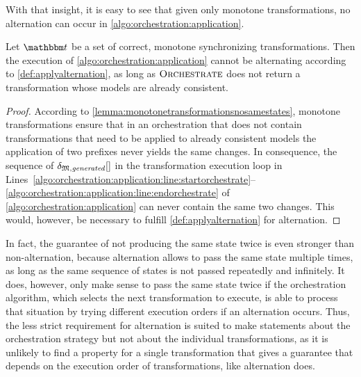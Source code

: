 With that insight, it is easy to see that given only monotone transformations, no alternation can occur in \autoref{algo:orchestration:application}.
\begin{theorem}
    Let $\transformationset{T}$ be a set of correct, monotone synchronizing transformations.
    Then the execution of \autoref{algo:orchestration:application} cannot be alternating according to \autoref{def:applyalternation}, as long as $\textsc{Orchestrate}$ does not return a transformation whose models are already consistent.
\end{theorem}
\begin{proof}
    According to \autoref{lemma:monotonetransformationsnosamestates}, monotone transformations ensure that in an orchestration that does not contain transformations that need to be applied to already consistent models the application of two prefixes never yields the same changes.
    In consequence, the sequence of $\applyalggenerated$ in the transformation execution loop in 
    Lines~\ref{algo:orchestration:application:line:startorchestrate}--\ref{algo:orchestration:application:line:endorchestrate} of \autoref{algo:orchestration:application} can never contain the same two changes.
    This would, however, be necessary to fulfill \autoref{def:applyalternation} for alternation.
\end{proof}

In fact, the guarantee of not producing the same state twice is even stronger than non-alternation, because alternation allows to pass the same state multiple times, as long as the same sequence of states is not passed repeatedly and infinitely.
It does, however, only make sense to pass the same state twice if the orchestration algorithm, which selects the next transformation to execute, is able to process that situation by trying different execution orders if an alternation occurs.
Thus, the less strict requirement for alternation is suited to make statements about the orchestration strategy but not about the individual transformations, as it is unlikely to find a property for a single transformation that gives a guarantee that depends on the execution order of transformations, like alternation does.

